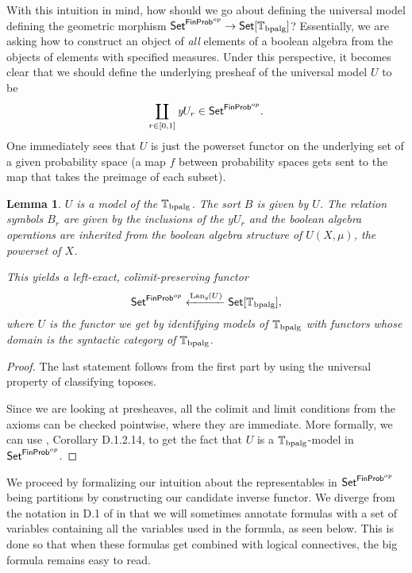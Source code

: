\documentclass[a4paper]{amsproc}
\theoremstyle{plain}
\newtheorem{lemma}[theorem]{Lemma}
\theoremstyle{definition}
\theoremstyle{remark}
\numberwithin{equation}{section}
\newcommand{\y}{\textit{y}}
\DeclareMathOperator{\Lan}{Lan}
\newcommand{\Set}{\textup{\textsf{Set}}}
\newcommand{\FinProb}{\textup{\textsf{FinProb}}}
\begin{document}
With this intuition in mind, how should we go about defining the universal model defining the geometric morphism $\Set^{\FinProb^{op}} \to \Set[\mathbb{T}_{\textup{bpalg}}]$? Essentially, we are asking how to construct an object of \emph{all} elements of a boolean algebra from the objects of elements with specified measures. Under this perspective, it becomes clear that we should define the underlying presheaf of the universal model $U$ to be
\[
\coprod_{r \in [0,1]} \y U_r \in \Set^{\FinProb^{op}} .
\]
One immediately sees that $U$ is just the powerset functor on the underlying set of a given probability space (a map $f$ between probability spaces gets sent to the map that takes the preimage of each subset).

\begin{lemma} \label{universal model}
$U$ is a model of the $\mathbb{T}_{\textup{bpalg}}$. The sort $B$ is given by $U$. The relation symbols $B_r$ are given by the inclusions of the $\y U_r$ and the boolean algebra operations are inherited from the boolean algebra structure of $U(X, \mu)$, the powerset of $X$.

This yields a left-exact, colimit-preserving functor
\[
    \Set^{\FinProb^{op}} \xleftarrow{\Lan_{\y}(U)} \Set[\mathbb{T}_{\textup{bpalg}}],
\]
where $U$ is the functor we get by identifying models of $\mathbb{T}_{\textup{bpalg}}$ with functors whose domain is the syntactic category of $\mathbb{T}_{\textup{bpalg}}$.
\end{lemma}
\begin{proof}
The last statement follows from the first part by using the universal property of classifying toposes.

Since we are looking at presheaves, all the colimit and limit conditions from the axioms can be checked pointwise, where they are immediate. More formally, we can use \cite{johnstone2002sketches2}, Corollary D.1.2.14, to get the fact that $U$ is a $\mathbb{T}_{\textup{bpalg}}$-model in $\Set^{\FinProb^{op}}$.
\end{proof}

We proceed by formalizing our intuition about the representables in $\Set^{\FinProb^{op}}$ being partitions by constructing our candidate inverse functor. We diverge from the notation in D.1 of \cite{johnstone2002sketches2} in that we will sometimes annotate formulas with a set of variables containing all the variables used in the formula, as seen below. This is done so that when these formulas get combined with logical connectives, the big formula remains easy to read.
\end{document}
